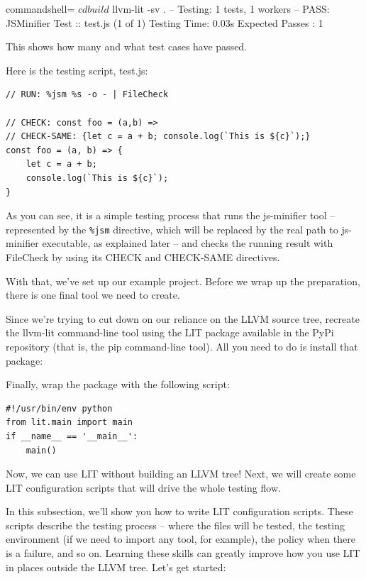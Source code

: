 \begin{tcblisting}{commandshell={}}
$ cd build
$ llvm-lit -sv .
-- Testing: 1 tests, 1 workers –
PASS: JSMinifier Test :: test.js (1 of 1)
Testing Time: 0.03s
  Expected Passes : 1
\end{tcblisting}

This shows how many and what test cases have passed.

Here is the testing script, test.js:

\begin{lstlisting}[style=styleJavaScript]
// RUN: %jsm %s -o - | FileCheck

// CHECK: const foo = (a,b) =>
// CHECK-SAME: {let c = a + b; console.log(`This is ${c}`);}
const foo = (a, b) => {
	let c = a + b;
	console.log(`This is ${c}`);
}
\end{lstlisting}

As you can see, it is a simple testing process that runs the js-minifier tool – represented by the \texttt{\%jsm} directive, which will be replaced by the real path to js-minifier executable, as explained later – and checks the running result with FileCheck by using its CHECK and CHECK-SAME directives.

With that, we've set up our example project. Before we wrap up the preparation, there is one final tool we need to create.

Since we're trying to cut down on our reliance on the LLVM source tree, recreate the llvm-lit command-line tool using the LIT package available in the PyPi repository (that is, the pip command-line tool). All you need to do is install that package:


Finally, wrap the package with the following script:

\begin{lstlisting}[style=stylePython]
#!/usr/bin/env python
from lit.main import main
if __name__ == '__main__':
	main()
\end{lstlisting}

Now, we can use LIT without building an LLVM tree! Next, we will create some LIT configuration scripts that will drive the whole testing flow.


In this subsection, we'll show you how to write LIT configuration scripts. These scripts describe the testing process – where the files will be tested, the testing environment (if we need to import any tool, for example), the policy when there is a failure, and so on. Learning these skills can greatly improve how you use LIT in places outside the LLVM tree. Let's get started:

